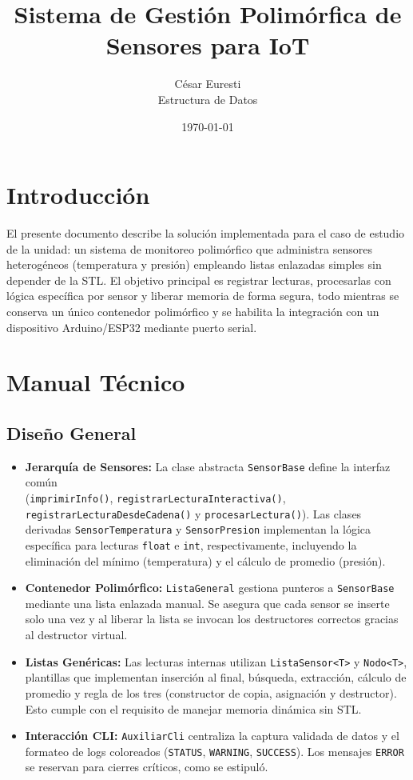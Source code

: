 \documentclass[11pt,a4paper]{article}
\title{Sistema de Gestión Polimórfica de Sensores para IoT}
\author{César Euresti\\ \normalsize Estructura de Datos}
\date{\today}
\begin{document}
\maketitle

\section{Introducción}

El presente documento describe la solución implementada para el caso de estudio de la unidad: un sistema de monitoreo polimórfico que administra sensores heterogéneos (temperatura y presión) empleando listas enlazadas simples sin depender de la STL. El objetivo principal es registrar lecturas, procesarlas con lógica específica por sensor y liberar memoria de forma segura, todo mientras se conserva un único contenedor polimórfico y se habilita la integración con un dispositivo Arduino/ESP32 mediante puerto serial.

\section{Manual Técnico}

\subsection{Diseño General}

\begin{itemize}[leftmargin=1.5em]
    \item \textbf{Jerarquía de Sensores:} La clase abstracta \texttt{SensorBase} define la interfaz común \\ (\texttt{imprimirInfo()}, \texttt{registrarLecturaInteractiva()}, \texttt{registrarLecturaDesdeCadena()} y \texttt{procesarLectura()}). Las clases derivadas \texttt{SensorTemperatura} y \texttt{SensorPresion} implementan la lógica específica para lecturas \texttt{float} e \texttt{int}, respectivamente, incluyendo la eliminación del mínimo (temperatura) y el cálculo de promedio (presión).
    \item \textbf{Contenedor Polimórfico:} \texttt{ListaGeneral} gestiona punteros a \texttt{SensorBase} mediante una lista enlazada manual. Se asegura que cada sensor se inserte solo una vez y al liberar la lista se invocan los destructores correctos gracias al destructor virtual.
    \item \textbf{Listas Genéricas:} Las lecturas internas utilizan \texttt{ListaSensor<T>} y \texttt{Nodo<T>}, plantillas que implementan inserción al final, búsqueda, extracción, cálculo de promedio y regla de los tres (constructor de copia, asignación y destructor). Esto cumple con el requisito de manejar memoria dinámica sin STL.
    \item \textbf{Interacción CLI:} \texttt{AuxiliarCli} centraliza la captura validada de datos y el formateo de logs coloreados (\texttt{STATUS}, \texttt{WARNING}, \texttt{SUCCESS}). Los mensajes \texttt{ERROR} se reservan para cierres críticos, como se estipuló.
\end{itemize}
\end{document}
